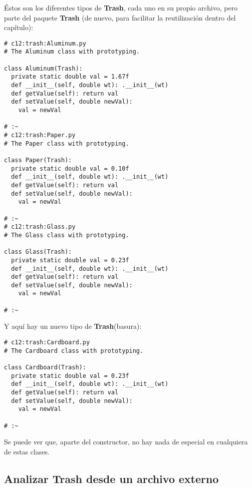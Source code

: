 Éstos son los diferentes tipos de \textbf{Trash}, cada uno en su propio archivo, pero parte del paquete \textbf{Trash} (de nuevo, para facilitar la reutilización dentro del capítulo):       \newline

\begin{lstlisting} 
# c12:trash:Aluminum.py  
# The Aluminum class with prototyping. 

class Aluminum(Trash): 
  private static double val = 1.67f 
  def __init__(self, double wt): .__init__(wt)  
  def getValue(self): return val  
  def setValue(self, double newVal): 
    val = newVal 
    
# :~ 
# c12:trash:Paper.py  
# The Paper class with prototyping. 

class Paper(Trash): 
  private static double val = 0.10f 
  def __init__(self, double wt): .__init__(wt)  
  def getValue(self): return val  
  def setValue(self, double newVal): 
    val = newVal 
    
# :~ 
# c12:trash:Glass.py  
# The Glass class with prototyping.

class Glass(Trash): 
  private static double val = 0.23f 
  def __init__(self, double wt): .__init__(wt)  
  def getValue(self): return val  
  def setValue(self, double newVal): 
    val = newVal 
    
# :~ 
\end{lstlisting}

Y aquí hay un nuevo tipo de \textbf{Trash}(basura):

\begin{lstlisting} 
# c12:trash:Cardboard.py  
# The Cardboard class with prototyping. 

class Cardboard(Trash): 
  private static double val = 0.23f 
  def __init__(self, double wt): .__init__(wt)  
  def getValue(self): return val  
  def setValue(self, double newVal): 
    val = newVal 
    
# :~ 
\end{lstlisting}

Se puede ver que, aparte del constructor, no hay nada de especial en cualquiera de estas clases.





\subsection*{Analizar \textbf{Trash} desde un archivo externo}
\label{subsec:atduae}


